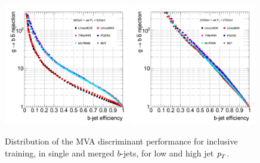 \begin{figure}[tp]
\centering
\includegraphics[width=0.49\textwidth]{FIGS/TEMPFigs/MVA_differentMethods/inclusive/MVAs_RejvsEff40.pdf}
\includegraphics[width=0.49\textwidth]{FIGS/TEMPFigs/MVA_differentMethods/inclusive/MVAs_RejvsEff200.pdf}
\caption{Distribution of the MVA discriminant performance for inclusive training, in single and merged $b$-jets, for low and high jet ${\emph{p}_{T}}$.}
\label{fig:diffmethodsPerfInclusive}
\end{figure}


